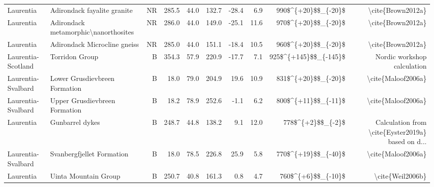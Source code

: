 \begin{longtable}{p{1 in}p{1 in}rrrrrrrr}
                     Laurentia &                      Adirondack fayalite granite &     NR &     285.5 &      44.0 & 132.7 & -28.4 &       6.9 &    990\$\textasciicircum \{+20\}\$\$\_\{-20\}\$ &                                  \textbackslash cite\{Brown2012a\} \\
                     Laurentia &             Adirondack metamorphic\textbackslash nanorthosites &     NR &     286.0 &      44.0 & 149.0 & -25.1 &      11.6 &    970\$\textasciicircum \{+20\}\$\$\_\{-20\}\$ &                                  \textbackslash cite\{Brown2012a\} \\
                     Laurentia &                     Adirondack Microcline gneiss &     NR &     285.0 &      44.0 & 151.1 & -18.4 &      10.5 &    960\$\textasciicircum \{+20\}\$\$\_\{-20\}\$ &                                  \textbackslash cite\{Brown2012a\} \\
            Laurentia-Scotland &                                   Torridon Group &      B &     354.3 &      57.9 & 220.9 & -17.7 &       7.1 &  925\$\textasciicircum \{+145\}\$\$\_\{-145\}\$ &                        Nordic workshop calculation \\
            Laurentia-Svalbard &                    Lower Grusdievbreen Formation &      B &      18.0 &      79.0 & 204.9 &  19.6 &      10.9 &    831\$\textasciicircum \{+20\}\$\$\_\{-20\}\$ &                                 \textbackslash cite\{Maloof2006a\} \\
            Laurentia-Svalbard &                    Upper Grusdievbreen Formation &      B &      18.2 &      78.9 & 252.6 &  -1.1 &       6.2 &    800\$\textasciicircum \{+11\}\$\$\_\{-11\}\$ &                                 \textbackslash cite\{Maloof2006a\} \\
                     Laurentia &                                  Gunbarrel dykes &      B &     248.7 &      44.8 & 138.2 &   9.1 &      12.0 &      778\$\textasciicircum \{+2\}\$\$\_\{-2\}\$ &  Calculation from \textbackslash cite\{Eyster2019a\} based on d... \\
            Laurentia-Svalbard &                        Svanbergfjellet Formation &      B &      18.0 &      78.5 & 226.8 &  25.9 &       5.8 &    770\$\textasciicircum \{+19\}\$\$\_\{-40\}\$ &                                 \textbackslash cite\{Maloof2006a\} \\
                     Laurentia &                             Uinta Mountain Group &      B &     250.7 &      40.8 & 161.3 &   0.8 &       4.7 &     760\$\textasciicircum \{+6\}\$\$\_\{-10\}\$ &                                   \textbackslash cite\{Weil2006b\} \\

\end{longtable}
